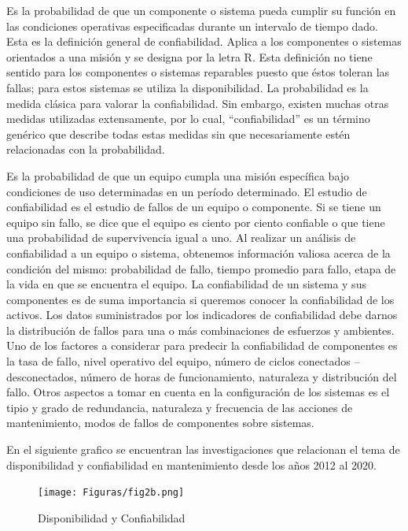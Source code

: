 \documentclass[]{article}
\begin{document}
Es la probabilidad de que un componente o sistema pueda cumplir su función en las condiciones operativas especificadas durante un intervalo de tiempo dado. Esta es la definición general de confiabilidad. Aplica a los componentes o sistemas orientados a una misión y se designa por la letra R. Esta definición no tiene sentido para los componentes o sistemas reparables puesto que éstos toleran las fallas; para estos sistemas se utiliza la disponibilidad.
La probabilidad es la medida clásica para valorar la confiabilidad. Sin embargo, existen muchas otras medidas utilizadas extensamente, por lo cual, “confiabilidad” es un término genérico que describe todas estas medidas sin que necesariamente estén relacionadas con la probabilidad.\cite{rios2014iso}

Es la probabilidad de que un equipo cumpla una misión específica bajo condiciones de uso determinadas en un período determinado. El estudio de confiabilidad es el estudio de fallos de un equipo o componente. Si se tiene un equipo sin fallo, se dice que el equipo es ciento por ciento confiable o que tiene una probabilidad de supervivencia igual a uno. Al realizar un análisis de confiabilidad a un equipo o sistema, obtenemos información valiosa acerca de la condición del mismo: probabilidad de fallo, tiempo promedio para fallo, etapa de la vida en que se encuentra el equipo.
La confiabilidad de un sistema y sus componentes es de suma importancia si queremos conocer la confiabilidad de los activos. Los datos suministrados por los indicadores de confiabilidad debe darnos la distribución de fallos para una o más combinaciones de esfuerzos y ambientes. Uno de los factores a considerar para predecir la confiabilidad de componentes es la tasa de fallo, nivel operativo del equipo, número de ciclos conectados – desconectados, número de horas de funcionamiento, naturaleza y distribución del fallo. Otros aspectos a tomar en cuenta en la configuración de los sistemas es el tipio y grado de redundancia, naturaleza y frecuencia de las acciones de mantenimiento, modos de fallos de componentes sobre sistemas.\cite{zapata2011confiabilidad}

En el siguiente grafico se encuentran las investigaciones que relacionan el tema de disponibilidad y confiabilidad en mantenimiento desde los años 2012 al 2020.


\begin{figure}[!h]
    \centering
    \texttt{[image: Figuras/fig2b.png]}
    \caption{Disponibilidad y Confiabilidad}
    \label{fig:my_label}
\end{figure}
\end{document}
